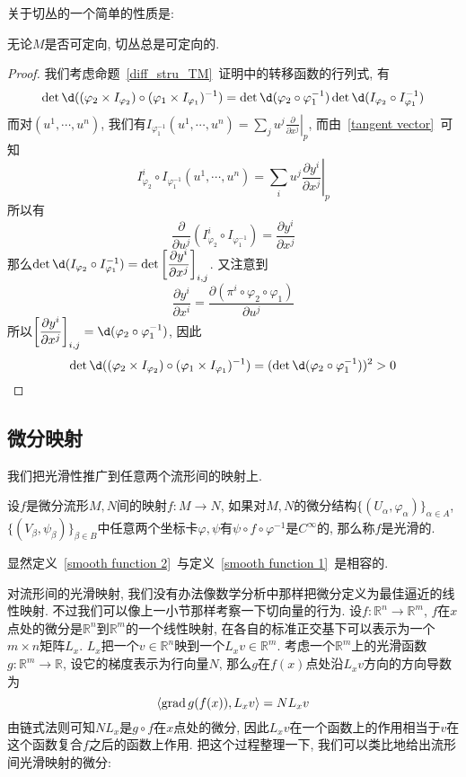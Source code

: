 关于切丛的一个简单的性质是:
\begin{prop}
    无论$M$是否可定向, 切丛总是可定向的.
\end{prop}
\begin{proof}
    我们考虑命题~\ref{diff_stru_TM}~证明中的转移函数的行列式, 有
    \[\det\d((\varphi_2\times I_{\varphi_2})\circ(\varphi_1\times I_{\varphi_1})^{-1})=\det\d(\varphi_2\circ\varphi_1^{-1})\det\d(I_{\varphi_2}\circ I_{\varphi_1}^{-1})\]
    而对$(u^1,\cdots,u^n)$, 我们有$\displaystyle I_{\varphi_1^{-1}}(u^1,\cdots,u^n)=\left.\sum_{j}u^j\frac{\partial}{\partial x^j}\right|_p$, 而由~\eqref{tangent vector}~可知
    \[\displaystyle I_{\varphi_2}^i\circ I_{\varphi_1^{-1}}(u^1,\cdots,u^n)=\left.\sum_{i}u^j\frac{\partial y^i}{\partial x^j}\right|_p\]
    所以有
    \[\frac{\partial}{\partial u^j}(I_{\varphi_2}^i\circ I_{\varphi_1^{-1}})=\frac{\partial y^i}{\partial x^j}\]
    那么$\det\d(I_{\varphi_2}\circ I_{\varphi_1}^{-1})=\det\left[\dfrac{\partial y^i}{\partial x^j}\right]_{i,j}$.
    又注意到
    \[\frac{\partial y^i}{\partial x^i}=\frac{\partial(\pi^i\circ\varphi_2\circ\varphi_1)}{\partial u^j}\]
    所以$\left[\dfrac{\partial y^i}{\partial x^j}\right]_{i,j}=\d(\varphi_2\circ\varphi_1^{-1})$, 因此
    \[\det\d((\varphi_2\times I_{\varphi_2})\circ(\varphi_1\times I_{\varphi_1})^{-1})=(\det\d(\varphi_2\circ\varphi_1^{-1}))^2>0\qedhere\]
\end{proof}

\subsection*{微分映射}

我们把光滑性推广到任意两个流形间的映射上.

\begin{defn}\label{smooth function 2}
    设$f$是微分流形$M,N$间的映射$f:M\to N$, 如果对$M,N$的微分结构$\{(U_\alpha,\varphi_\alpha)\}_{\alpha\in A}$, $\{(V_\beta,\psi_\beta)\}_{\beta\in B}$中任意两个坐标卡$\varphi,\psi$有$\psi\circ f\circ\varphi^{-1}$是$C^\infty$的, 那么称$f$是光滑的.
\end{defn}

显然定义~\ref{smooth function 2}~与定义~\ref{smooth function 1}~是相容的.

对流形间的光滑映射, 我们没有办法像数学分析中那样把微分定义为最佳逼近的线性映射.
不过我们可以像上一小节那样考察一下切向量的行为.
设$f:\mathbb{R}^n\to\mathbb{R}^m$, $f$在$x$点处的微分是$\mathbb{R}^n$到$\mathbb{R}^m$的一个线性映射, 在各自的标准正交基下可以表示为一个$m\times n$矩阵$L_x$.
$L_x$把一个$v\in\mathbb{R}^n$映到一个$L_xv\in\mathbb{R}^m$.
考虑一个$\mathbb{R}^m$上的光滑函数$g:\mathbb{R}^m\to\mathbb{R}$, 设它的梯度表示为行向量$N$, 那么$g$在$f(x)$点处沿$L_xv$方向的方向导数为
\[\langle\operatorname{grad}{g(f(x))},L_xv\rangle=NL_xv\]
由链式法则可知$NL_x$是$g\circ f$在$x$点处的微分, 因此$L_xv$在一个函数上的作用相当于$v$在这个函数复合$f$之后的函数上作用.
把这个过程整理一下, 我们可以类比地给出流形间光滑映射的微分:


